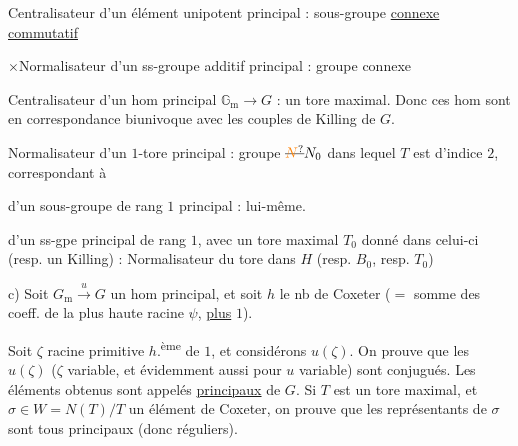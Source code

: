 
Centralisateur d'un élément unipotent principal : sous-groupe \uline{connexe}  \uline{commutatif}

$\times$\quad Normalisateur d'un ss-groupe additif principal : groupe connexe 

Centralisateur d'un hom principal $\mathbb G_{\mathrm m}\to G$ : un tore maximal. Donc ces hom sont en correspondance biunivoque avec les couples de Killing de $G$.


Normalisateur d'un $1$-tore principal : groupe $\deleted{\unsure{N}}N_0$ dans lequel $T$ est d'indice $2$, correspondant à 

 d'un sous-groupe  de rang $1$ principal : lui-même.

 d'un ss-gpe principal de rang $1$, avec un tore maximal $T_0$ donné dans celui-ci (resp. un  Killing) : Normalisateur du tore dans $H$ (resp. $B_0$, resp. $T_0$)


c) Soit $G_{\mathrm m}\xrightarrow{u}G$ un hom principal, et soit  $h$  le nb de Coxeter ($=$ somme des coeff. de la plus haute racine $\psi$, \uline{plus} $1$).

Soit $\zeta$  racine primitive $h$.\textsuperscript{ème} de $1$, et considérons $u(\zeta)$. On prouve que les $u(\zeta)$ ($\zeta$ variable, et évidemment aussi pour $u$ variable) sont conjugués. Les éléments obtenus sont appelés  \uline{principaux}  de $G$. Si $T$ est un tore maximal, et $\sigma\in W=N(T)/T$  un  élément de Coxeter, on prouve que les représentants de $\sigma$ sont tous principaux (donc réguliers).

